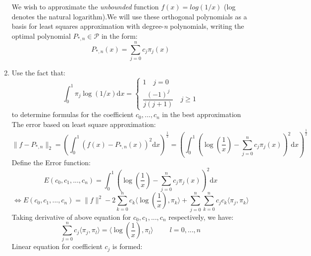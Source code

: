 \documentclass[14pt,a4paper]{article}
\begin{document}
\begin{enumerate}
	\label{3b}	
	We wish to approximate the \textit{unbounded} function $f(x)= log(1/x)$ (log denotes the natural logarithm).We will use these orthogonal polynomials as a basis for least squares approximation with degree-\textit{n} polynomials, writing the optimal polynomial $P_{*,n} \in \mathcal{P}$ in the form:
	\hspace*{5cm} $$ P_{*,n}(x) = \sum_{j=0}^{n} c_j\pi_j(x)$$
	\item Use the fact that: $$ \int_{0}^{1}\pi_j\log(1/x)\mathrm{d}x = \begin{cases} 1 \quad j = 0\\ \dfrac{(-1)^j}{j(j+1)} \quad j \geq 1 \end{cases} $$
	to determine formulas for the coefficient $c_0, ..., c_n$ in the best approximation\\
	The error based on least square approximation: $$ \|f-P_{*,n}\|_2 = \left( \int_{0}^{1}\left(f(x)-P_{*,n}(x)\right)^2\mathrm{d}x\right)^{\frac{1}{2}} = \left( \int_{0}^{1}\left(\log(\frac{1}{x})-\sum_{j=0}^{n} c_j\pi_j(x)\right)^2\mathrm{d}x\right)^{\frac{1}{2}} $$
	Define the Error function: $$E(c_0,c_1, ...,c_n) = \int_{0}^{1}\left(\log(\frac{1}{x})-\sum_{j=0}^{n} c_j\pi_j(x)\right)^2\mathrm{d}x $$
	 $$\Leftrightarrow E(c_0,c_1,...,c_n) = \|f\|^2 - 2\sum_{k=0}^{n}c_k\langle\log(\frac{1}{x}),\pi_k\rangle + \sum_{j=0}^{n}\sum_{k=0}^{n}c_jc_k\langle\pi_j,\pi_k\rangle $$
	Taking derivative of above equation for $c_0,c_1,...,c_n$ respectively, we have:
	$$ \sum_{j=0}^{n}c_j\langle\pi_j,\pi_l\rangle = \langle\log(\frac{1}{x}),\pi_l\rangle \hspace{1cm} l = 0,...,n$$
	Linear equation for coefficient $c_j$ is formed:\\

\end{enumerate}
\end{document}
